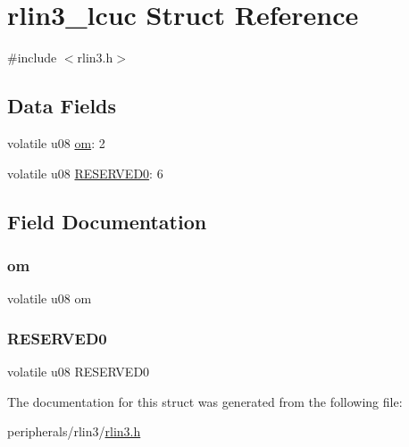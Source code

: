 \hypertarget{structrlin3__lcuc}{}\section{rlin3\+\_\+lcuc Struct Reference}
\label{structrlin3__lcuc}


{\ttfamily \#include $<$rlin3.\+h$>$}

\subsection*{Data Fields}
\begin{DoxyCompactItemize}
\item 
volatile u08 \mbox{\hyperlink{structrlin3__lcuc_a0a4e1dde7f02379c3f0d58bac29b2aa1}{om}}\+: 2
\item 
volatile u08 \mbox{\hyperlink{structrlin3__lcuc_a59c0b30ccfb89f1b34e9682741859abd}{R\+E\+S\+E\+R\+V\+E\+D0}}\+: 6
\end{DoxyCompactItemize}


\subsection{Field Documentation}
\mbox{\label{structrlin3__lcuc_a0a4e1dde7f02379c3f0d58bac29b2aa1}} 
\subsubsection{\texorpdfstring{om}{om}}
{\footnotesize\ttfamily volatile u08 om}

\mbox{\label{structrlin3__lcuc_a59c0b30ccfb89f1b34e9682741859abd}} 
\subsubsection{\texorpdfstring{R\+E\+S\+E\+R\+V\+E\+D0}{RESERVED0}}
{\footnotesize\ttfamily volatile u08 R\+E\+S\+E\+R\+V\+E\+D0}



The documentation for this struct was generated from the following file\+:\begin{DoxyCompactItemize}
\item 
peripherals/rlin3/\mbox{\hyperlink{rlin3_8h}{rlin3.\+h}}\end{DoxyCompactItemize}
